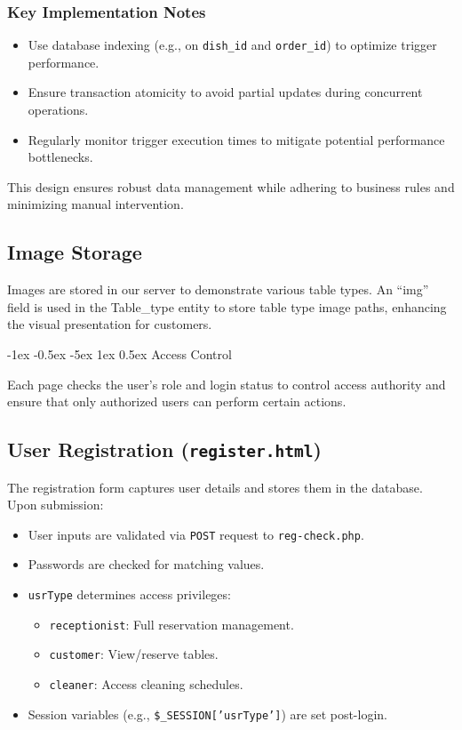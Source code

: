 \documentclass[12pt]{article}
\makeatletter
\renewcommand\section{\@startsection{section}{1}{\z@}%
    {-1ex \@plus -0.5ex \@minus -5ex} %
    {1ex \@plus 0.5ex} %
    {\normalfont\Large\bfseries}} %
\makeatother
\begin{document}
\subsubsection*{Key Implementation Notes}
\begin{itemize}
\item Use database indexing (e.g., on \texttt{dish\_id} and \texttt{order\_id}) to optimize trigger performance.
\item Ensure transaction atomicity to avoid partial updates during concurrent operations.
\item Regularly monitor trigger execution times to mitigate potential performance bottlenecks.
\end{itemize}

This design ensures robust data management while adhering to business rules and minimizing manual intervention.

\subsection{Image Storage}
Images are stored in our server to demonstrate various table types. An ``img'' field is used in the Table\_type entity to store table type image paths, enhancing the visual presentation for customers.


\section{Access Control}

Each page checks the user's role and login status to control access authority and ensure that only authorized users can perform certain actions.

\subsection{User Registration (\texttt{register.html})}

The registration form captures user details and stores them in the database. Upon submission:

\begin{itemize}
    \item User inputs are validated via \texttt{POST} request to \texttt{reg-check.php}.
    \item Passwords are checked for matching values.
    \item \texttt{usrType} determines access privileges:
    \begin{itemize}
        \item \texttt{receptionist}: Full reservation management.
        \item \texttt{customer}: View/reserve tables.
        \item \texttt{cleaner}: Access cleaning schedules.
    \end{itemize}
    \item Session variables (e.g., \texttt{\$\_SESSION['usrType']}) are set post-login.
\end{itemize}
\end{document}
